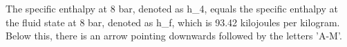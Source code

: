 The specific enthalpy at 8 bar, denoted as h_4, equals the specific enthalpy at the fluid state at 8 bar, denoted as h_f, which is 93.42 kilojoules per kilogram. Below this, there is an arrow pointing downwards followed by the letters 'A-M'.